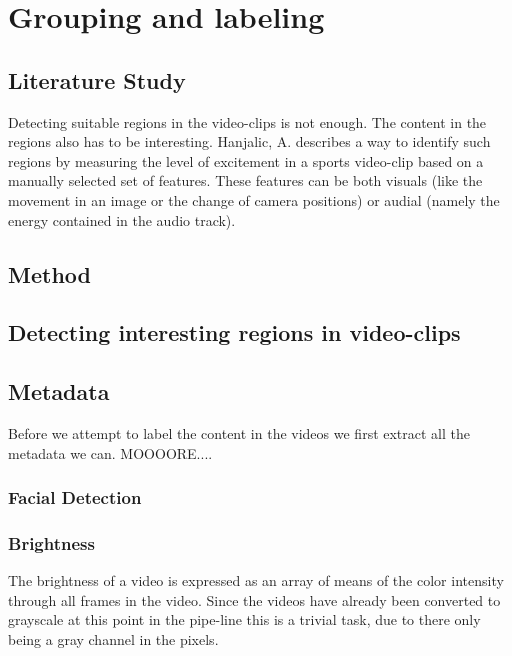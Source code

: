 %
\section{Grouping and labeling}
%

%
\subsection{Literature Study}
%
Detecting suitable regions in the video-clips is not enough. The content in the regions also has to be interesting. Hanjalic, A. \cite{citeulike:405480} describes a way to identify such regions by measuring the level of excitement in a sports video-clip based on a manually selected set of features. These features can be both visuals (like the movement in an image or the change of camera positions) or audial (namely the energy contained in the audio track).%
%
\subsection{Method}
%

%
\subsection{Detecting interesting regions in video-clips}
%

%
\subsection{Metadata}
%
Before we attempt to label the content in the videos we first extract all the metadata we can. MOOOORE....
%
\subsubsection{Facial Detection}
%

%
\subsubsection{Brightness}
%
The brightness of a video is expressed as an array of means of the color intensity through all frames in the video. Since the videos have already been converted to grayscale at this point in the pipe-line this is a trivial task, due to there only being a gray channel in the pixels.
%

